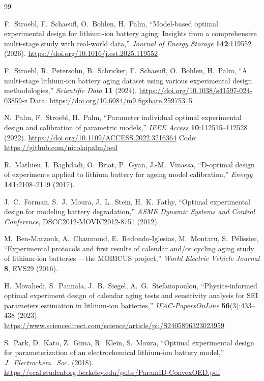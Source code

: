 \documentclass[11pt,letterpaper]{article}
\newcommand{\dash}{\,---\,}
\begin{document}
\begin{thebibliography}{99}\small

 F.~Stroebl, F.~Schaeufl, O.~Bohlen, H.~Palm, ``Model-based optimal experimental design for lithium-ion battery aging: Insights from a comprehensive multi-stage study with real-world data,'' \emph{Journal of Energy Storage} \textbf{142}:119552 (2026). \url{https://doi.org/10.1016/j.est.2025.119552}

 F.~Stroebl, R.~Petersohn, B.~Schricker, F.~Schaeufl, O.~Bohlen, H.~Palm, ``A multi-stage lithium-ion battery aging dataset using various experimental design methodologies,'' \emph{Scientific Data} \textbf{11} (2024). \url{https://doi.org/10.1038/s41597-024-03859-z} Data: \url{https://doi.org/10.6084/m9.figshare.25975315}

 N.~Palm, F.~Stroebl, H.~Palm, ``Parameter individual optimal experimental design and calibration of parametric models,'' \emph{IEEE Access} \textbf{10}:112515--112528 (2022). \url{https://doi.org/10.1109/ACCESS.2022.3216364} Code: \url{https://github.com/nicolaipalm/oed}

 R.~Mathieu, I.~Baghdadi, O.~Briat, P.~Gyan, J.-M.~Vinassa, ``D-optimal design of experiments applied to lithium battery for ageing model calibration,'' \emph{Energy} \textbf{141}:2108--2119 (2017).

 J.~C.~Forman, S.~J.~Moura, J.~L.~Stein, H.~K.~Fathy, ``Optimal experimental design for modeling battery degradation,'' \emph{ASME Dynamic Systems and Control Conference}, DSCC2012-MOVIC2012-8751 (2012).

 M.~Ben-Marzouk, A.~Chaumond, E.~Redondo-Iglesias, M.~Montaru, S.~P\'elissier, ``Experimental protocols and first results of calendar and/or cycling aging study of lithium-ion batteries\dash the MOBICUS project,'' \emph{World Electric Vehicle Journal} \textbf{8}, EVS29 (2016).

 H.~Movahedi, S.~Pannala, J.~B.~Siegel, A.~G.~Stefanopoulou, ``Physics-informed optimal experiment design of calendar aging tests and sensitivity analysis for SEI parameters estimation in lithium-ion batteries,'' \emph{IFAC-PapersOnLine} \textbf{56}(3):433--438 (2023). \url{https://www.sciencedirect.com/science/article/pii/S2405896323023959}

 S.~Park, D.~Kato, Z.~Gima, R.~Klein, S.~Moura, ``Optimal experimental design for parameterization of an electrochemical lithium-ion battery model,'' \emph{J.\ Electrochem.\ Soc.} (2018). \url{https://ecal.studentorg.berkeley.edu/pubs/ParamID-ConvexOED.pdf}


\end{thebibliography}
\end{document}

